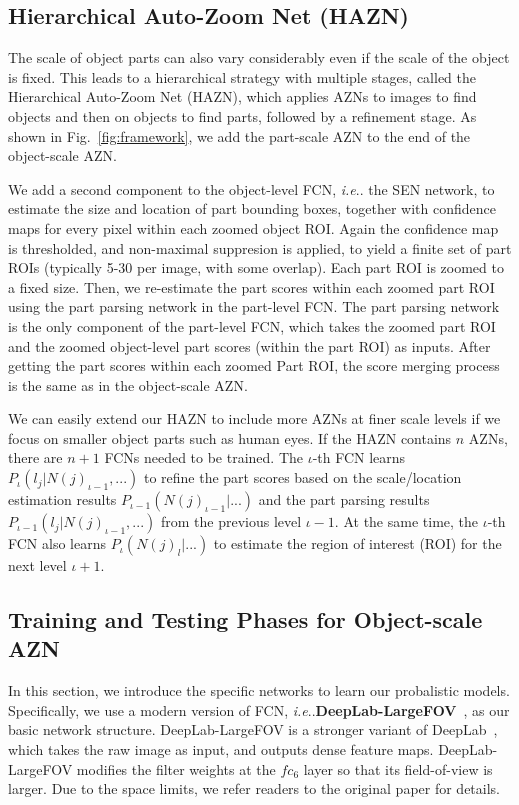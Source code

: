 \documentclass[runningheads]{llncs}
\makeatletter
\DeclareRobustCommand\onedot{\futurelet\@let@token\@onedot}
\def\@onedot{\ifx\@let@token.\else.\null\fi\xspace}
\def\ie{\emph{i.e}\onedot} \def\Ie{\emph{I.e}\onedot}
\makeatother
\begin{document}
\subsection{Hierarchical Auto-Zoom Net (HAZN)}
\vspace{-0.4\baselineskip}
\label{subsec:HAZN}
The scale of object parts can also vary considerably even if the scale of the object is fixed. This leads to a hierarchical strategy with multiple stages, called the Hierarchical Auto-Zoom Net (HAZN), which applies AZNs to images to find objects and then on objects to find parts, followed by a refinement stage. As shown in Fig.~\ref{fig:framework}, we add the part-scale AZN to the end of the object-scale AZN.

We add a second component to the object-level FCN, \ie the SEN network, to estimate the size and location of part bounding boxes, together with confidence maps for every pixel within each zoomed object ROI. Again the confidence map is thresholded, and non-maximal suppresion is applied, to yield a finite set of part ROIs (typically 5-30 per image, with some overlap). Each part ROI is zoomed to a fixed size. Then, we re-estimate the part scores within each zoomed part ROI using the part parsing network in the part-level FCN. The part parsing network is the only component of the part-level FCN, which takes the zoomed part ROI and the zoomed object-level part scores (within the part ROI) as inputs. After getting the part scores within each zoomed Part ROI, the score merging process is the same as in the object-scale AZN.

We can easily extend our HAZN to include more AZNs at finer scale levels if we focus on smaller object parts such as human eyes.
If the HAZN contains $n$ AZNs, there are $n+1$ FCNs needed to be trained. The $\iota$-th FCN learns $P_\iota(l_j | N(j)_{\iota-1}, ...)$ to refine the part scores based on the scale/location estimation results $P_{\iota-1}(N(j)_{\iota-1} | ...)$ and the part parsing results $P_{\iota-1}(l_j | N(j)_{\iota-1}, ...)$ from the previous level $\iota-1$. At the same time, the $\iota$-th FCN also learns $P_\iota(N(j)_l | ...)$ to estimate the region of interest (ROI) for the next level $\iota+1$.

\vspace{0.6\baselineskip}
\subsection{Training and Testing Phases for Object-scale AZN}
\label{subsec:train_test}
In this section, we introduce the specific networks to learn our probalistic models. Specifically, we use a modern version of FCN, \ie \textbf{DeepLab-LargeFOV}~\cite{chen2014semantic}, as our basic network structure. DeepLab-LargeFOV is a stronger variant of DeepLab~\cite{chen2014semantic}, which takes the raw image as input, and outputs dense feature maps. DeepLab-LargeFOV modifies the filter weights at the $fc_6$ layer so that its field-of-view is larger. Due to the space limits, we refer readers to the original paper for details.
\end{document}
